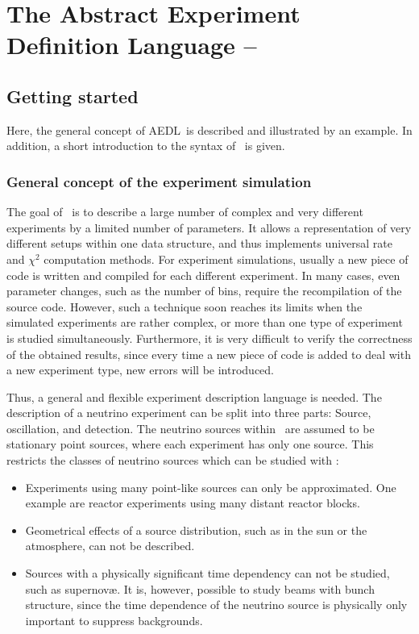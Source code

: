 
\part{The Abstract Experiment Definition Language -- \AEDL }
\label{part:2}

\chapter{Getting started}

Here, the general concept of AEDL\ is described and illustrated by an example. In addition, a short introduction to the syntax of \AEDL\ is given.

\section{General concept of the experiment simulation}

The goal of \AEDL\ is to describe a large number of complex and very 
different experiments by a limited number of parameters. It allows a
representation of very different setups within one data structure, and thus implements universal rate and $\chi^2$ computation methods. For experiment simulations, usually a new piece of code is written and compiled
for each different experiment. In many cases, even parameter changes, such as
the number of bins, require the recompilation of the source code. 
However, such a technique soon reaches its limits when the simulated experiments are rather complex, or more than one type of experiment is studied simultaneously. Furthermore, it is very difficult to verify the correctness of the obtained results, since every time a new piece of code is added to 
deal with a new experiment type, new errors will be introduced.

Thus, a general and flexible experiment description language is needed.  
The description of a neutrino experiment can be split into three parts: Source, oscillation, and detection. The neutrino sources within \GLOBES\ 
are assumed to be stationary point sources, where each experiment has only 
one source. This restricts the classes of neutrino sources which can be studied with \GLOBES :
\begin{itemize}
\item
 Experiments using many point-like sources can only be approximated. One example are reactor experiments using many distant reactor blocks.
\item
 Geometrical effects of a source distribution, such as in the sun or the atmosphere, can not be described.
\item
 Sources with a physically significant time dependency  can not be studied, such as  supernov\ae. It is, however, possible
to study beams with bunch structure, since the time dependence of the
neutrino source is physically only important to suppress backgrounds. 
\end{itemize}

